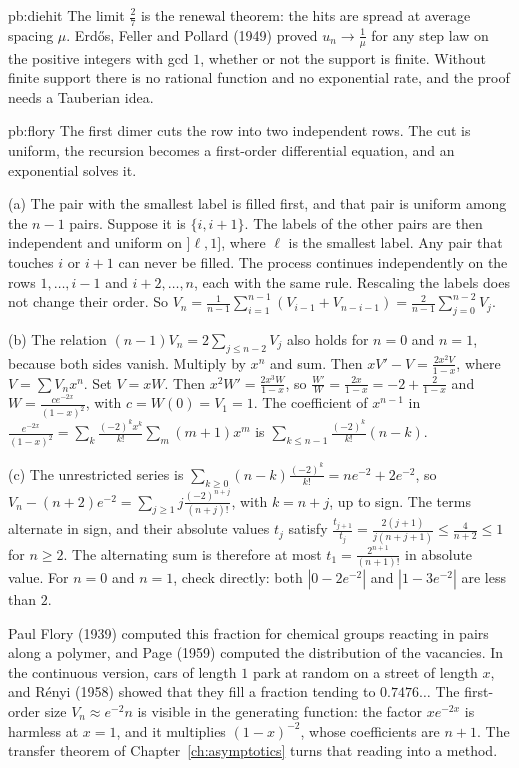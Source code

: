 \begin{solution}{pb:diehit}
\leads The limit $\frac27$ is the renewal theorem: the hits are spread at average spacing $\mu$. Erd\H os, Feller and Pollard (1949) proved $u_n\to\frac1\mu$ for any step law on the positive integers
with gcd $1$, whether or not the support is finite. Without finite support there is no rational function and no exponential rate, and the proof needs a Tauberian idea.
\end{solution}

\begin{solution}{pb:flory}
\idea The first dimer cuts the row into two independent rows. The cut is uniform, the recursion becomes a first-order differential equation, and an exponential solves it.

\writeup (a) The pair with the smallest label is filled first, and that pair is uniform among the $n-1$ pairs. Suppose it is $\{i,i+1\}$. The labels of the other pairs are then independent and
uniform on $]\ell,1]$, where $\ell$ is the smallest label. Any pair that touches $i$ or $i+1$ can never be filled. The process continues independently on the rows $1,\dots,i-1$ and
$i+2,\dots,n$, each with the same rule. Rescaling the labels does not change their order. So $V_n=\frac1{n-1}\sum_{i=1}^{n-1}(V_{i-1}+V_{n-i-1})=\frac2{n-1}\sum_{j=0}^{n-2}V_j$.

(b) The relation $(n-1)V_n=2\sum_{j\le n-2}V_j$ also holds for $n=0$ and $n=1$, because both sides vanish. Multiply by $x^n$ and sum. Then $xV'-V=\frac{2x^2V}{1-x}$, where $V=\sum V_nx^n$. Set $V=xW$. Then
$x^2W'=\frac{2x^3W}{1-x}$, so $\frac{W'}W=\frac{2x}{1-x}=-2+\frac2{1-x}$ and $W=\frac{ce^{-2x}}{(1-x)^2}$, with $c=W(0)=V_1=1$. The coefficient of $x^{n-1}$ in $\frac{e^{-2x}}{(1-x)^2}=\sum_k\frac{(-2)^kx^k}{k!}\sum_m(m+1)x^m$ is
$\sum_{k\le n-1}\frac{(-2)^k}{k!}(n-k)$.

(c) The unrestricted series is $\sum_{k\ge0}(n-k)\frac{(-2)^k}{k!}=ne^{-2}+2e^{-2}$, so $V_n-(n+2)e^{-2}=\sum_{j\ge1}j\frac{(-2)^{n+j}}{(n+j)!}$, with $k=n+j$, up to sign. The terms alternate in sign, and their absolute values $t_j$
satisfy $\frac{t_{j+1}}{t_j}=\frac{2(j+1)}{j(n+j+1)}\le\frac4{n+2}\le1$ for $n\ge2$. The alternating sum is therefore at most $t_1=\frac{2^{n+1}}{(n+1)!}$ in absolute value. For $n=0$ and $n=1$, check directly: both $|0-2e^{-2}|$ and $|1-3e^{-2}|$ are less than $2$.

\leads Paul Flory (1939) computed this fraction for chemical groups reacting in pairs along a polymer, and Page (1959) computed the distribution of the vacancies. In the continuous
version, cars of length $1$ park at random on a street of length $x$, and R\'enyi (1958) showed that they fill a fraction tending to $0.7476\ldots$ The first-order
size $V_n\approx e^{-2}n$ is visible in the generating function: the factor $xe^{-2x}$ is harmless at $x=1$, and it multiplies $(1-x)^{-2}$, whose coefficients
are $n+1$. The transfer theorem of Chapter~\ref{ch:asymptotics} turns that reading into a method.
\end{solution}

